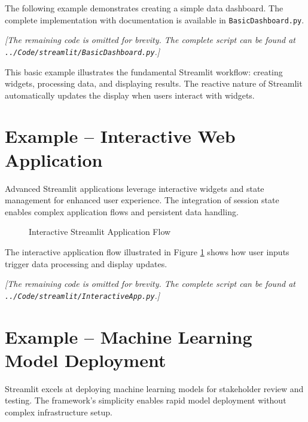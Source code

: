 The following example demonstrates creating a simple data dashboard. The complete implementation with documentation is available in \texttt{BasicDashboard.py}.



\noindent\textit{[The remaining code is omitted for brevity. The complete script can be found at \texttt{../Code/streamlit/BasicDashboard.py}.]}

This basic example illustrates the fundamental Streamlit workflow: creating widgets, processing data, and displaying results. The reactive nature of Streamlit automatically updates the display when users interact with widgets.

\section{Example -- Interactive Web Application}
\label{sec:interactive_example}

Advanced Streamlit applications leverage interactive widgets and state management for enhanced user experience. The integration of session state enables complex application flows and persistent data handling.


\begin{figure}[htbp]
	\centering
    
	\caption{Interactive Streamlit Application Flow}
	\label{fig:interactive_flow}
\end{figure}

The interactive application flow illustrated in Figure \ref{fig:interactive_flow} shows how user inputs trigger data processing and display updates.



\noindent\textit{[The remaining code is omitted for brevity. The complete script can be found at \texttt{../Code/streamlit/InteractiveApp.py}.]}

\section{Example -- Machine Learning Model Deployment}
\label{sec:ml_example}

Streamlit excels at deploying machine learning models for stakeholder review and testing. The framework's simplicity enables rapid model deployment without complex infrastructure setup.


